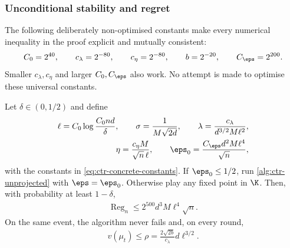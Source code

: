 \subsubsection{Unconditional stability and regret}

The following deliberately non-optimised constants make every numerical
inequality in the proof explicit and mutually consistent:
\begin{align}
    C_0=2^{40},
    \qquad
    c_\lambda=2^{-80},
    \qquad
    c_\eta=2^{-80},
    \qquad
    b=2^{-20},
    \qquad
    C_\eps=2^{200}.
    \label{eq:ctr-concrete-constants}
\end{align}
Smaller $c_\lambda,c_\eta$ and larger $C_0,C_\eps$ also work.  No attempt is
made to optimise these universal constants.

\begin{theorem}
    \label{thm:ctr-main}
    Let $\delta\in(0,1/2)$ and define
    \begin{align}
        \ell=C_0\log\frac{C_0nd}{\delta},
        \qquad
        \sigma=\frac1{M\sqrt{2d}},
        \qquad
        \lambda=\frac{c_\lambda}{d^{3/2}M\ell^2},
        \label{eq:ctr-main-parameters-a}
        \\
        \eta=\frac{c_\eta M}{\sqrt n\,\ell},
        \qquad
        \eps_0=\frac{C_\eps d^2M\ell^4}{\sqrt n},
        \label{eq:ctr-main-parameters-b}
    \end{align}
    with the constants in \eqref{eq:ctr-concrete-constants}.  If
    $\eps_0\leq1/2$, run \cref{alg:ctr-unprojected} with $\eps=\eps_0$.
    Otherwise play any fixed point in $\K$.  Then, with probability at least
    $1-\delta$,
    \begin{align}
        \operatorname{Reg}_n
        \leq2^{500}d^3M\ell^4\sqrt n.
        \label{eq:ctr-main-regret}
    \end{align}
    On the same event, the algorithm never fails and, on every round,
    \begin{align}
        v(\mu_t)
        \leq\rho
        =\frac{2\sqrt{2b}}{c_\lambda}d\ell^{3/2}.
        \label{eq:ctr-main-confinement}
    \end{align}
\end{theorem}

